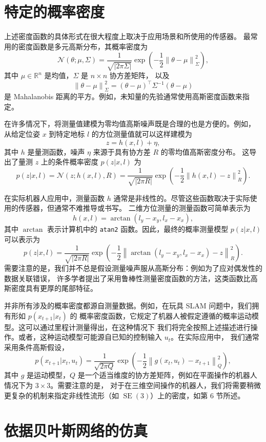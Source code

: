 \documentclass[fontset=none]{Notes}
\DeclareMathOperator\SE{SE}
\newcommand{\norm}[1]{\left\lVert#1\right\rVert}
\begin{document}
\section{特定的概率密度}

上述密度函数的具体形式在很大程度上取决于应用场景和所使用的传感器。
最常用的密度函数是多元高斯分布，其概率密度为
\[
  \mathcal{N}(\theta;\mu,\Sigma)=\frac{1}{\sqrt{|2\pi\Sigma|}}
  \exp\left(-\frac{1}{2}\norm{\theta-\mu}_{\Sigma}^2\right),
\]
其中 $\mu\in \mathbb{R}^n$ 是均值，$\Sigma$ 是 $n\times n$ 协方差矩阵，
以及
\[
  \norm{\theta-\mu}_{\Sigma}^2=(\theta-\mu)^\top\Sigma^{-1}(\theta-\mu)
\]
是 Mahalanobis 距离的平方。例如，未知量的先验通常使用高斯密度函数来指定。

在许多情况下，将测量值建模为零均值高斯噪声既是合理的也是方便的。例如，
从给定位姿 $x$ 到特定地标 $l$ 的方位测量值就可以这样建模为
\[
  z=h(x,l)+\eta,
\]
其中 $h$ 是量测函数，噪声 $\eta$ 来源于具有协方差 $R$ 的零均值高斯密度分布。
这导出了量测 $z$ 上的条件概率密度 $p(z|x,l)$ 为
\[
  p(z|x,l)=\mathcal N(z;h(x,l),R)=\frac{1}{\sqrt{|2\pi R|}}\exp\left(
    -\frac{1}{2}\norm{h(x,l)-z}_R^2
  \right).
\]

在实际机器人应用中，测量函数 $h$ 通常是非线性的。尽管这些函数取决于实际使用的传感器，但通常不难推导或书写。
二维方位测量的测量函数可简单表示为
\[
  h(x,l)=\arctan(l_y-x_y,l_x-x_x),
\]
其中 $\arctan$ 表示计算机中的 \texttt{atan2} 函数。因此，最终的概率测量模型
$p(z|x,l)$ 可以表示为
\[
  p(z|x,l)=\frac{1}{\sqrt{|2\pi R|}}\exp\left(
    -\frac{1}{2}\norm{\arctan(l_y-x_y,l_x-x_x)-z}_R^2
  \right).
\]
需要注意的是，我们并不总是假设测量噪声服从高斯分布：例如为了应对偶发性的数据关联错误，
许多学者提出了采用鲁棒性测量密度函数的方法，这类函数比高斯密度具有更厚的尾部特征。

并非所有涉及的概率密度都源自测量数据。例如，在玩具 SLAM 问题中，我们拥有形如 $p(x_{t+1}|x_t)$ 的
概率密度函数，它规定了机器人被假定遵循的概率运动模型。这可以通过里程计测量得出，在这种情况下
我们将完全按照上述描述进行操作。或者，这种运动模型可能源自已知的控制输入 $u_t$。在实际应用中，
我们通常采用条件高斯假设，
\[
  p(x_{t+1}|x_t,u_t)=\frac{1}{\sqrt{2\pi Q}}\exp\left(
    -\frac{1}{2}\norm{g(x_t,u_t)-x_{t+1}}_Q^2
  \right),
\]
其中 $g$ 是运动模型，$Q$ 是一个适当维度的协方差矩阵，例如在平面操作的机器人情况下为 $3×3$。需要注意的是，
对于在三维空间操作的机器人，我们将需要稍微更复杂的机制来指定非线性流形（如 $\SE(3)$）上的密度，如第 6 节所述。

\section{依据贝叶斯网络的仿真}
\end{document}
